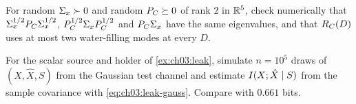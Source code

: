 \begin{exercise}\label{exr:ch03:prog-spec}
For random $\Sigma_x\succ0$ and random $P_C\succeq0$ of rank $2$ in $\mathbb{R}^5$, check numerically that $\Sigma_x^{1/2}P_C\Sigma_x^{1/2}$, $P_C^{1/2}\Sigma_xP_C^{1/2}$ and $P_C\Sigma_x$ have the same eigenvalues, and that $R_C(D)$ uses at most two water-filling modes at every $D$.
\end{exercise}

\begin{exercise}\label{exr:ch03:prog-leak}
For the scalar source and holder of \cref{ex:ch03:leak}, simulate $n=10^5$ draws of $(X,\hat X,S)$ from the Gaussian test channel and estimate $I(X;\hat X\mid S)$ from the sample covariance with \eqref{eq:ch03:leak-gauss}. Compare with $0.661$ bits.
\end{exercise}



